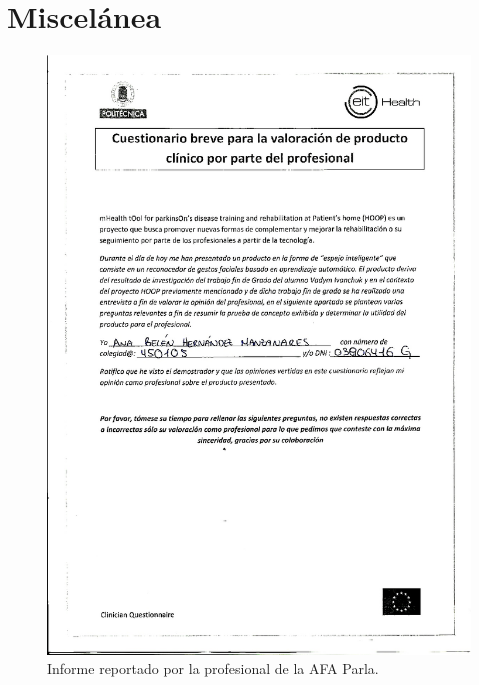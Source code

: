 \chapter{Miscelánea} \label{Appendix:Miscellaneous}

\begin{figure}
    \centering
    \includegraphics[width=\textwidth]{Images/informe_1.png}
    \caption{Informe reportado por la profesional de la AFA Parla.}
    \label{fig:Informe_1}
\end{figure}

